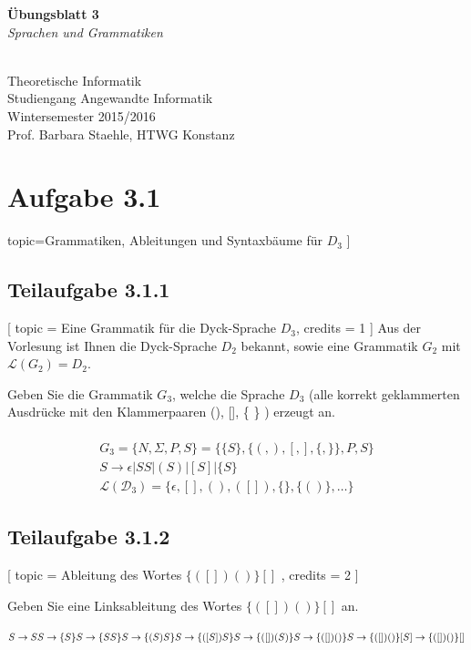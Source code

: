 \documentclass[12pt]{article}
\begin{document}
  
\begin{center}
\begin{huge}
\textbf{Übungsblatt 3}\\
\textit{ Sprachen und Grammatiken
}\end{huge} \\

Theoretische Informatik\\
Studiengang Angewandte Informatik\\
Wintersemester 2015/2016\\
Prof. Barbara Staehle, HTWG Konstanz
\end{center}
\section*{Aufgabe 3.1}  
 topic={Grammatiken, Ableitungen und Syntaxbäume für $D_3$} 
 ] 
  
 \subsection*{Teilaufgabe 3.1.1} [ 
 topic = {Eine Grammatik für die Dyck-Sprache $D_3$}, 
 credits = 1 
 ] 
 Aus der Vorlesung ist Ihnen die Dyck-Sprache $D_2$ bekannt, sowie eine Grammatik $G_2$ mit $\mathcal{L}(G_2) = D_2$.  
  
 Geben Sie die Grammatik $G_3$, welche die Sprache $D_3$ (alle korrekt geklammerten Ausdrücke mit den Klammerpaaren (), [], \{ \} ) erzeugt an.   \\\\
 \begin{align*}
 G_3 = \{N,\Sigma,P,S\} = \{\{S\},\{(,),[,],\{,\}\},P,S\}\\
 S \rightarrow \epsilon | SS | (S) | [S] | \{S\}\\
 \mathcal{L(D_3)} = \{\epsilon,[],(),([]),\{\},\{()\},\ldots \}
 \end{align*}
  
  
 \subsection*{Teilaufgabe 3.1.2} [ 
 topic = {Ableitung des Wortes $\{([])()\}[]$ }, 
 credits = 2 
 ] 
  
 Geben Sie eine Linksableitung des Wortes $\{([])()\}[]$ an. \\\\
  $
S \rightarrow SS\\
	\rightarrow \{S\}S\\
	\rightarrow \{SS\}S\\
	\rightarrow \{(S)S\}S\\  
	\rightarrow \{([S])S\}S\\
	\rightarrow \{([])(S)\}S\\
	\rightarrow \{([])()\}S\\
	\rightarrow \{([])()\}[S]\\
		\rightarrow \{([])()\}[]
  $
  
\end{document}
